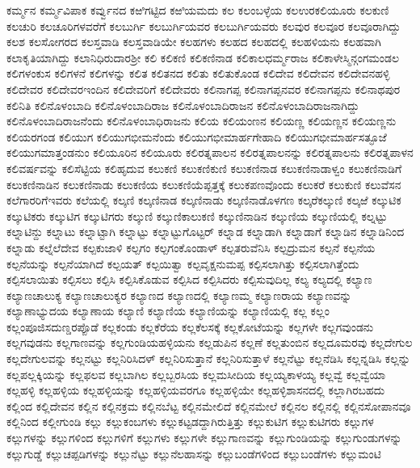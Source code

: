 {ಕರ್ಮ್ಮನ
ಕರ್ಮ್ಮವಿಪಾಕ
ಕರ್ವ್ವುನದ
ಕಱಿಗಟ್ಟಿದ
ಕಱಿಯಮದು
ಕಲ
ಕಲಂಬಳ್ಳೆಯ
ಕಲಉರಕಲಿಯೂರು
ಕಲಕುಣಿ
ಕಲಚುರಿ
ಕಲಚೂರಿಗಳವರೆಗೆ
ಕಲಬುರ್ಗಿ
ಕಲಬುರ್ಗಿಯವರ
ಕಲಬುರ್ಗಿಯವರು
ಕಲವುರ
ಕಲವೂರ
ಕಲವೂರಾಗಿದ್ದು
ಕಲಶ
ಕಲಸೋಗರದ
ಕಲಸ್ತವಾಡಿ
ಕಲಸ್ತವಾಡಿಯೇ
ಕಲಹಗಳು
ಕಲಹದ
ಕಲಹದಲ್ಲಿ
ಕಲಹಳಿಯನು
ಕಲಹವಾಗಿ
ಕಲಾಕೃತಿಯಾಗಿದ್ದು
ಕಲಾನಿಧಿರುದಾರಶ್ರೀ
ಕಲಿ
ಕಲಿಕಣಿ
ಕಲಿಕಣಿನಾಡ
ಕಲಿಕಾಲಧರ್ಮ್ಮರಾಜ
ಕಲಿಕಾಳೇಸ್ಮಿನ್ಗಂಗಮಂಡಲ
ಕಲಿಗಳಂಕುಸ
ಕಲಿಗಳನೆ
ಕಲಿಗಳನ್ನು
ಕಲಿತ
ಕಲಿತನದ
ಕಲಿತು
ಕಲಿತುಕೊಂಡ
ಕಲಿದೇವ
ಕಲಿದೇವನ
ಕಲಿದೇವನಹಳ್ಳಿ
ಕಲಿದೇವರ
ಕಲಿದೇವರಇಂದಿನ
ಕಲಿದೇವರಿಗೆ
ಕಲಿದೇವರು
ಕಲಿನಾಗಪ್ಪ
ಕಲಿನಾಗಪ್ಪನವರ
ಕಲಿನಾಗಪ್ಪನು
ಕಲಿನಾಥಪುರ
ಕಲಿನಿತಿ
ಕಲಿನೊಳಂಬಾದಿ
ಕಲಿನೊಳಂಬಾದಿರಾಜ
ಕಲಿನೊಳಂಬಾದಿರಾಜನ
ಕಲಿನೊಳಂಬಾದಿರಾಜನಾಗಿದ್ದು
ಕಲಿನೊಳಂಬಾದಿರಾಜನೆಂದು
ಕಲಿನೊಳಂಬಾಧಿರಾಜನು
ಕಲಿಯ
ಕಲಿಯಂಣನ
ಕಲಿಯಣ್ಣ
ಕಲಿಯಣ್ಣನ
ಕಲಿಯಣ್ಣನು
ಕಲಿಯರಗಂಡ
ಕಲಿಯುಗ
ಕಲಿಯುಗಭೀಮನೆಂದು
ಕಲಿಯುಗಭೀಮಾರ್ಹಗೇಹಾದಿ
ಕಲಿಯುಗಭೀಮಾರ್ಹಸತ್ಫೂಜೆ
ಕಲಿಯುಗಮಾತ್ತಂಡನುಂ
ಕಲಿಯೂರಿನ
ಕಲಿಯೂರು
ಕಲಿರತ್ನಪಾಲನ
ಕಲಿರತ್ನಪಾಲನನ್ನು
ಕಲಿರತ್ನಪಾಲನು
ಕಲಿರತ್ನಪಾಳನ
ಕಲಿವರ್ಷವನ್ನು
ಕಲಿಸೆಟ್ಟಿಯ
ಕಲಿಹೃದುವ
ಕಲುಕಣಿ
ಕಲುಕಣಿಕುಣಿ
ಕಲುಕಣಿನಾಡ
ಕಲುಕಣಿನಾಡಾಳ್ವಂ
ಕಲುಕಣಿನಾಡಿಗೆ
ಕಲುಕಣಿನಾಡಿನ
ಕಲುಕಣಿನಾಡು
ಕಲುಕಣಿಯ
ಕಲುಕಣಿಯೆಪ್ಪತ್ತಕ್ಕೆ
ಕಲುಕಪಣವೊಂದು
ಕಲುಕರೆ
ಕಲುಕುಣಿ
ಕಲುವೆಸನ
ಕಲೆಗಾರರಿಗೆಇವರು
ಕಲೆಯಲ್ಲಿ
ಕಲ್ಕಣಿ
ಕಲ್ಕಣಿನಾಡ
ಕಲ್ಕಣಿನಾಡು
ಕಲ್ಕಣಿನಾಡೊಳಗಣ
ಕಲ್ಕರೆಕಲ್ಕುಣಿ
ಕಲ್ಕಱೆ
ಕಲ್ಕುಟಿಕ
ಕಲ್ಕುಟಿಕರು
ಕಲ್ಕುಟಿಗ
ಕಲ್ಕುಟಿಗರು
ಕಲ್ಕುಣಿ
ಕಲ್ಕುಣಿಕಾಲುಕಣಿ
ಕಲ್ಕುಣಿನಾಡಿನ
ಕಲ್ಕುಣಿಯ
ಕಲ್ಕುಣಿಯಲ್ಲಿ
ಕಲ್ನಟ್ಟು
ಕಲ್ನಾಟಿನ್ದು
ಕಲ್ನಾಟು
ಕಲ್ನಾಟ್ಟಾಗಿ
ಕಲ್ನಾಟ್ಟು
ಕಲ್ನಾಟ್ಟುಗೊಟ್ಟರ್
ಕಲ್ನಾಡ
ಕಲ್ನಾಡಾಗಿ
ಕಲ್ನಾಡಾಗೆ
ಕಲ್ನಾಡಿನ
ಕಲ್ನಾಡಿನಿಂದ
ಕಲ್ನಾಡು
ಕಲ್ನೆಲೆದೇವ
ಕಲ್ಪಕುಜಾಳಿ
ಕಲ್ಪಗಂ
ಕಲ್ಪಗಂಕೊಂಡಾಳ್
ಕಲ್ಪತರುವೆನಿಸಿ
ಕಲ್ಪದ್ರುಮನ
ಕಲ್ಪನೆ
ಕಲ್ಪನೆಯ
ಕಲ್ಪನೆಯನ್ನು
ಕಲ್ಪನೆಯಾಗಿದೆ
ಕಲ್ಪಯತ್
ಕಲ್ಪಯಿತ್ವಾ
ಕಲ್ಪವೃಕ್ಷನುಮಪ್ಪ
ಕಲ್ಪಿಸಲಾಗಿತ್ತು
ಕಲ್ಪಿಸಲಾಗಿತ್ತೆಂದು
ಕಲ್ಪಿಸಲಾಯಿತು
ಕಲ್ಪಿಸಲು
ಕಲ್ಪಿಸಿ
ಕಲ್ಪಿಸಿಕೊಡುವ
ಕಲ್ಪಿಸಿದ
ಕಲ್ಪಿಸಿದರು
ಕಲ್ಪಿಸುವುದಿಲ್ಲ
ಕಲ್ಯ
ಕಲ್ಯದಲ್ಲಿ
ಕಲ್ಯಾಣ
ಕಲ್ಯಾಣಚಾಲುಕ್ಯ
ಕಲ್ಯಾಣಚಾಲುಕ್ಯರ
ಕಲ್ಯಾಣದ
ಕಲ್ಯಾಣದಲ್ಲಿ
ಕಲ್ಯಾಣಮ್ಮ
ಕಲ್ಯಾಣರಾಯ
ಕಲ್ಯಾಣವನ್ನು
ಕಲ್ಯಾಣಾಭ್ಯುದಯ
ಕಲ್ಯಾಣಾಯ
ಕಲ್ಯಾಣಿ
ಕಲ್ಯಾಣಿಯ
ಕಲ್ಯಾಣಿಯನ್ನು
ಕಲ್ಯಾಣಿಯಲ್ಲಿ
ಕಲ್ಲ
ಕಲ್ಲಂ
ಕಲ್ಲಂಪೂಜಿಸದುಣ್ಡರಪ್ಪೊಡೆ
ಕಲ್ಲಕಂಡು
ಕಲ್ಲಕೆರೆಯ
ಕಲ್ಲಕೆಲಸಕ್ಕೆ
ಕಲ್ಲಕೋಟೆಯನ್ನು
ಕಲ್ಲಗಳೇ
ಕಲ್ಲಗವುಂಡನು
ಕಲ್ಲಗವುಡನು
ಕಲ್ಲಗಾಣವನ್ನು
ಕಲ್ಲಗುಂಡಿಯಹಳ್ಳಿಯನು
ಕಲ್ಲಡುಪಿನ
ಕಲ್ಲಣೆ
ಕಲ್ಲತುಂಬಿನ
ಕಲ್ಲದೂಮರವು
ಕಲ್ಲದೇಗುಲ
ಕಲ್ಲದೇಗುಲವನ್ನು
ಕಲ್ಲನಟ್ಟು
ಕಲ್ಲನಿರಿಸಿದಳ್
ಕಲ್ಲನಿರಿಸುತ್ತಾನೆ
ಕಲ್ಲನಿರಿಸುತ್ತಾಳೆ
ಕಲ್ಲನೆಟ್ಟು
ಕಲ್ಲನೆಡಿಸಿ
ಕಲ್ಲನ್ನಡಿಸಿ
ಕಲ್ಲನ್ನು
ಕಲ್ಲಪಲ್ಲಕ್ಕಿಯನ್ನು
ಕಲ್ಲಫಲವ
ಕಲ್ಲಬಾಗಿಲ
ಕಲ್ಲಬ್ಬರಸಿಯ
ಕಲ್ಲಮಸೀದಿಯ
ಕಲ್ಲಯ್ಯಕಾಳಯ್ಯ
ಕಲ್ಲವ್ವೆ
ಕಲ್ಲವ್ವೆಯಾ
ಕಲ್ಲಹಳ್ಳಿ
ಕಲ್ಲಹಳ್ಳಿಯ
ಕಲ್ಲಹಳ್ಳಿಯನ್ನು
ಕಲ್ಲಹಳ್ಳಿಯವರಗೂ
ಕಲ್ಲಹಳ್ಳಿಯೇ
ಕಲ್ಲಹಳ್ಳಿಶಾಸನದಲ್ಲಿ
ಕಲ್ಲಾಗಿರಬಹದು
ಕಲ್ಲಿಂದ
ಕಲ್ಲಿದೇವನ
ಕಲ್ಲಿನ
ಕಲ್ಲಿನಕ್ರಮ
ಕಲ್ಲಿನಬೆಟ್ಟ
ಕಲ್ಲಿನಮೇಲಿದೆ
ಕಲ್ಲಿನಮೇಲೆ
ಕಲ್ಲಿನಲ
ಕಲ್ಲಿನಲ್ಲಿ
ಕಲ್ಲಿನಸೋಪಾನವೂ
ಕಲ್ಲಿನಿಂದ
ಕಲ್ಲೀಗುಂಡಿ
ಕಲ್ಲು
ಕಲ್ಲುಕಂಬಗಳು
ಕಲ್ಲುಕಟ್ಟಡದ್ದಾಗಿರುತ್ತಿತ್ತು
ಕಲ್ಲುಕುಟಿಗ
ಕಲ್ಲುಕುಟಿಗರು
ಕಲ್ಲುಗಳ
ಕಲ್ಲುಗಳನ್ನು
ಕಲ್ಲುಗಳಿಂದ
ಕಲ್ಲುಗಳಿಗೆ
ಕಲ್ಲುಗಳು
ಕಲ್ಲುಗಳೇ
ಕಲ್ಲುಗಾಣವನ್ನು
ಕಲ್ಲುಗುಂಡಿಯನ್ನು
ಕಲ್ಲುಗುಂಡುಗಳನ್ನು
ಕಲ್ಲುಗುಡ್ಡೆ
ಕಲ್ಲುಚಪ್ಪಡಿಗಳನ್ನು
ಕಲ್ಲುನೆಟ್ಟು
ಕಲ್ಲುನೆಲಹಾಸನ್ನು
ಕಲ್ಲುಬಂಡೆಗಳಿಂದ
ಕಲ್ಲುಬಂಡೆಗಳು
ಕಲ್ಲುಮಂಟಿ
}
